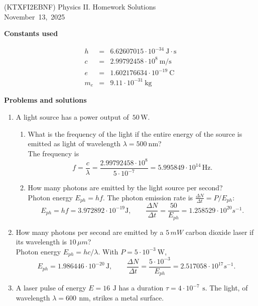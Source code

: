 \documentclass[a4paper,12pt]{letter}
\begin{document}
\begin{center}
(KTXFI2EBNF) Physics II.  Homework Solutions\\ \smallskip
November~13,~2025
 \end{center}

 \textbf{Constants used}

 
\begin{eqnarray*}
h &=& 6.62607015\cdot10^{-34}\ \mathrm{J\cdot s}\\
c &=& 2.99792458\cdot10^{8}\ \mathrm{m/s}\\
e &=& 1.602176634\cdot10^{-19}\ \mathrm{C}\\
m_e &=& 9.11\cdot10^{-31}\ \mathrm{kg}
\end{eqnarray*}

\textbf{Problems and solutions}

\begin{enumerate}
\item  A light source has a power output of $\,50\,\mathrm{W}.$

\begin{enumerate}
\item What is the frequency of the light if the entire energy of the source is emitted as light of wavelength $\lambda=500\ \mathrm{nm}$?\\

 The frequency is 
$$ f=\frac{c}{\lambda}=\frac{2.99792458\cdot10^{8}}{5\cdot10^{-7}}=5.995849\cdot 10^{14} \,\text{Hz}.$$

\item How many photons are emitted by the light source per second?\\

 Photon energy $E_{ph}=hf$. The photon emission rate is $\frac{\Delta N}{\Delta t} = P/E_{ph}$:
$$ E_{ph}=h f=3.972892\cdot  10^{-19}\text{J},\qquad \frac{\Delta N}{\Delta t}=\frac{50}{E_{ph}}=1.258529\cdot 10^{20} s^{-1}.$$
\end{enumerate}

\item  How many photons per second are emitted by a $ 5\,mW $ carbon dioxide laser if its wavelength is $ 10\,\mu m$?\\

 Photon energy $E_{ph}=hc/\lambda$. With $P=5\cdot10^{-3}\ \mathrm{W}$, $$ E_{ph}=1.986446\cdot 10^{-20}\,\text{J},\qquad \frac{\Delta N}{\Delta t}=\frac{5\cdot10^{-3}}{E_{ph}}=2.517058\cdot 10^{17} s^{-1}.$$

\item A laser pulse of energy $E=16\ \,\text{J}$ has a duration $\tau=4\cdot10^{-7}\ \,\text{s}$. The light, of wavelength $\lambda=600\ \,\text{nm}$, strikes a metal surface.


\end{enumerate}
\end{document}
